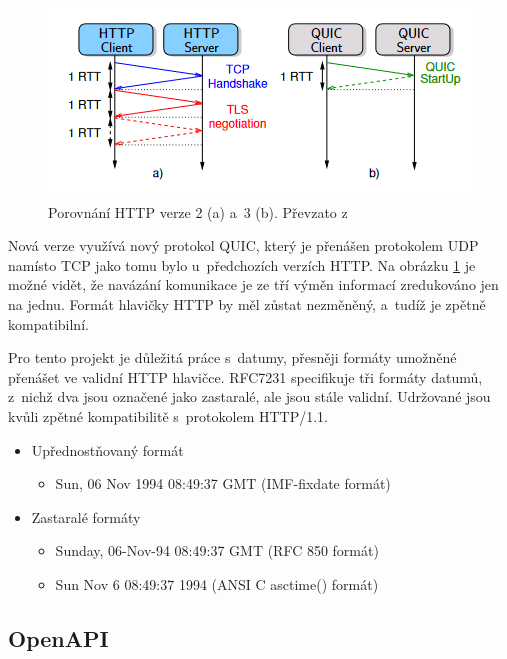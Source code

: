 \begin{figure}[h]
    \centering
    \includegraphics[width=0.8\linewidth]{other-fig/http_comparison.png}
    \caption{Porovnání HTTP verze 2 (a) a 3 (b). Převzato z \cite{HTTP3}}
    \label{fig:http_comparison}
\end{figure}

Nová verze využívá nový protokol QUIC, který je přenášen protokolem UDP namísto TCP jako tomu bylo u předchozích verzích HTTP. Na obrázku \ref{fig:http_comparison}
je možné vidět, že navázání komunikace je ze tří výměn informací zredukováno jen na jednu. Formát hlavičky HTTP by měl zůstat nezměněný, a tudíž je zpětně kompatibilní.

Pro tento projekt je důležitá práce s datumy, přesněji formáty umožněné přenášet ve validní HTTP hlavičce. RFC7231 specifikuje tři formáty datumů, z nichž dva
jsou označené jako zastaralé, ale jsou stále validní. Udržované jsou kvůli zpětné kompatibilitě s protokolem HTTP/1.1. \cite{RFC7231}

\newpage

\begin{itemize}
    \item Upřednostňovaný formát
    \begin{itemize}
        \item Sun, 06 Nov 1994 08:49:37 GMT (IMF-fixdate formát)
    \end{itemize}
    \item Zastaralé formáty
    \begin{itemize}
        \item Sunday, 06-Nov-94 08:49:37 GMT (RFC 850 formát)
        \item Sun Nov  6 08:49:37 1994 (ANSI C asctime() formát)
    \end{itemize}
\end{itemize}

\subsection{OpenAPI}

